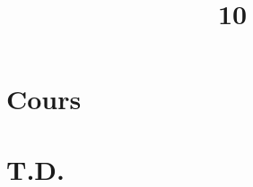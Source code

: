 \documentclass[a4paper]{article}
\title{10}{Séries entières}
\begin{document}
	\tableofcontents
	\clearpage
	\part{Cours}
	
	
	
	
	
	\clearpage\null\clearpage
	\renewcommand{\thesection}{}
	\renewcommand{\thesubsection}{}
	\part{T.D.}
	
	
\end{document}
